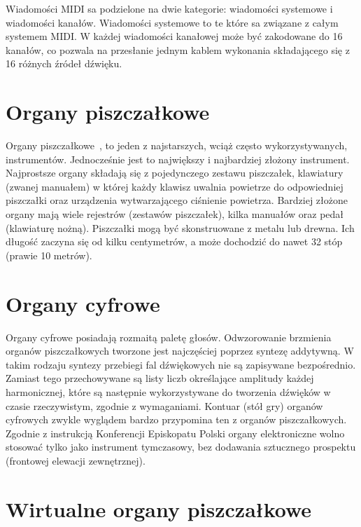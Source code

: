 \documentclass[11pt]{report}
\begin{document}
    Wiadomości MIDI sa podzielone na dwie kategorie: wiadomości systemowe i wiadomości kanałów.
    Wiadomości systemowe to te które sa związane z całym systemem MIDI.
    W każdej wiadomości kanałowej może być zakodowane do 16 kanałów, co pozwala na przesłanie jednym kablem wykonania składającego się z 16 różnych źródeł dźwięku.


    \section{Organy piszczałkowe}\label{sec:organy-piszczałkowe}
    Organy piszczałkowe~\cite{329316420170801}, to jeden z najstarszych, wciąż często wykorzystywanych, instrumentów.
    Jednocześnie jest to największy i najbardziej złożony instrument.
    Najprostsze organy składają się z pojedynczego zestawu piszczałek, klawiatury (zwanej manuałem) w której każdy klawisz uwalnia powietrze do odpowiedniej piszczałki oraz urządzenia wytwarzającego ciśnienie powietrza.
    Bardziej złożone organy mają wiele rejestrów (zestawów piszczałek), kilka manuałów oraz pedał (klawiaturę nożną).
    Piszczałki mogą być skonstruowane z metalu lub drewna.
    Ich długość zaczyna się od kilku centymetrów, a może dochodzić do nawet 32 stóp (prawie 10 metrów).


    \section{Organy cyfrowe}\label{sec:organy-cyfrowe}
    Organy cyfrowe posiadają rozmaitą paletę głosów.
    Odwzorowanie brzmienia organów piszczałkowych tworzone jest najczęściej poprzez syntezę addytywną.
    W takim rodzaju syntezy przebiegi fal dźwiękowych nie są zapisywane bezpośrednio.
    Zamiast tego przechowywane są listy liczb określające amplitudy każdej harmonicznej,
    które są następnie wykorzystywane do tworzenia dźwięków w czasie rzeczywistym, zgodnie z wymaganiami.
    Kontuar (stół gry) organów cyfrowych zwykle wyglądem bardzo przypomina ten z organów piszczałkowych.
    Zgodnie z instrukcją Konferencji Episkopatu Polski organy elektroniczne wolno stosować tylko jako instrument tymczasowy,
    bez dodawania sztucznego prospektu (frontowej elewacji zewnętrznej).


    \section{Wirtualne organy piszczałkowe}\label{sec:wirtualne-organy-piszczałkowe}
\end{document}

